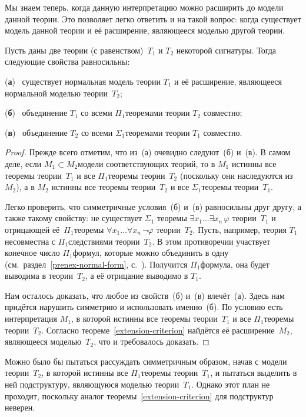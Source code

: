 Мы знаем теперь, когда данную интерпретацию можно расширить до
модели данной теории. Это позволяет легко ответить и на такой
вопрос: когда существует модель данной теории и её расширение,
являющееся моделью другой теории.

\begin{theorem}
        \label{pair-of-theories}%
Пусть даны две теории (с равенством)~$T_1$ и $T_2$ некоторой
сигнатуры. Тогда следующие свойства равносильны:

        (\textbf{а})~%
существует нормальная модель теории $T_1$ и её расширение,
являющееся нормальной моделью теории~$T_2$;

        (\textbf{б})~%
объединение $T_1$ со всеми $\Pi_1$\д теоремами теории $T_2$
совместно;

        (\textbf{в})~%
объединение $T_2$ со всеми $\Sigma_1$\д теоремами теории $T_1$
совместно.
\end{theorem}

\begin{proof}
Прежде всего отметим, что из~(а) очевидно следуют~(б) и~(в). В
самом деле, если $M_1\subset M_2$\т модели соответствующих
теорий, то в $M_1$ истинны все теоремы теории~$T_1$ и все
$\Pi_1$\д теоремы теории~$T_2$ (поскольку они наследуются
из~$M_2$), а в $M_2$ истинны все теоремы теории~$T_2$ и все
$\Sigma_1$\д теоремы теории~$T_1$.

Легко проверить, что симметричные условия~(б) и~(в) равносильны
друг другу, а также такому свойству: не существует $\Sigma_1$\д
теоремы $\exists x_1\ldots\exists x_n\,\varphi$ теории~$T_1$ и
отрицающей её~$\Pi_1$\д теоремы $\forall x_1\ldots\forall
x_n\,\lnot\varphi$ теории~$T_2$. Пусть, например, теория $T_1$
несовместна с $\Pi_1$\д следствиями теории~$T_2$. В этом
противоречии участвует конечное число $\Pi_1$\д формул,
которые можно объединить в одну
(см.~раздел~\ref{prenex-normal-form},
с.~\pageref{sigma-pi-closed}). Получится $\Pi_1$\д формула, она
будет выводима в теории~$T_2$, а её отрицание выводимо в $T_1$.

Нам осталось доказать, что любое из свойств~(б) и~(в) влечёт~(а).
Здесь нам придётся нарушить симметрию и использовать именно~(б).
По условию есть интерпретация $M_1$, в которой истинны все
теоремы теории~$T_1$ и все $\Pi_1$\д теоремы теории~$T_2$.
Согласно теореме~\ref{extension-criterion} найдётся её
расширение~$M_2$, являющееся моделью~$T_2$, что и требовалось
доказать.
\end{proof}

Можно было бы пытаться рассуждать симметричным образом,
начав с модели теории~$T_2$, в которой истинны все $\Pi_1$\д теоремы
теории~$T_1$, и пытаться выделить в ней подструктуру, являющуюся
моделью теории~$T_1$. Однако этот план не проходит, поскольку
аналог теоремы~\ref{extension-criterion} для подструктур неверен.

